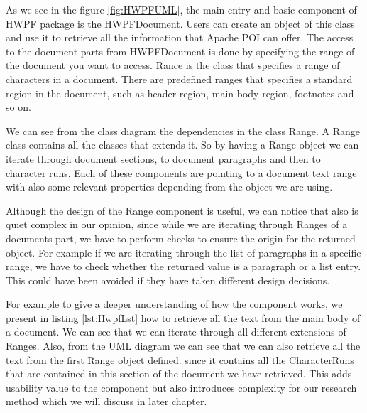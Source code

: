 As we see in the figure \ref{fig:HWPFUML}, the main entry and basic component of HWPF package is the HWPFDocument. Users can create an object of this class and use it to retrieve all the information that Apache POI can offer. The access to the document parts from HWPFDocument is done by specifying the range of the document you want to access. Rance is the class that specifies a range of characters in a document. There are predefined ranges that specifies a standard region in the document, such as header region, main body region, footnotes and so on. 

We can see from the class diagram the dependencies in the class Range. A Range class contains all the classes that extends it. So by having a Range object we can iterate through document sections, to document paragraphs and then to character runs. Each of these components are pointing to a document text range with also some relevant properties depending from the object we are using. 

Although the design of the Range component is useful, we can notice that also is quiet complex in our opinion, since while we are iterating through Ranges of a documents part, we have to perform checks to ensure the origin for the returned object. For example if we are iterating through the list of paragraphs in a specific range, we have to check whether the returned value is a paragraph or a list entry. This could have been avoided if they have taken different design decisions.

For example to give a deeper understanding of how the component works, we present in listing \ref{lst:HwpfLst} how to retrieve all the text from the main body of a document. We can see that we can iterate through all different extensions of Ranges. Also, from the UML diagram we can see that we can also retrieve all the text from the first Range object defined. since it contains all the CharacterRuns that are contained in this section of the document we have retrieved. This adds usability value to the component but also introduces complexity for our research method which we will discuss in later chapter.

